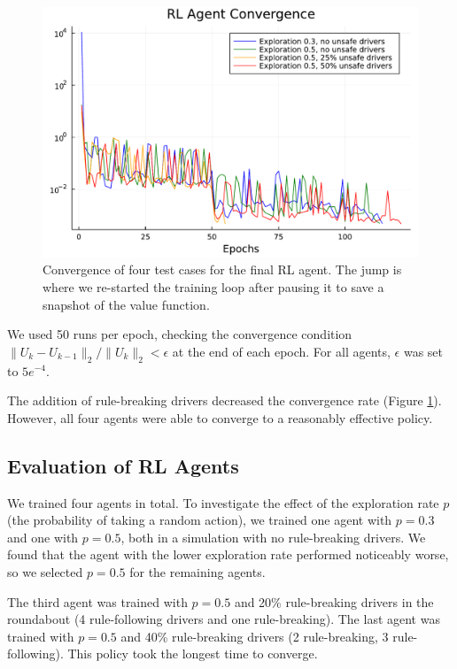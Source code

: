 \documentclass[conference]{IEEEtran}
\begin{document}
\begin{figure}[h]
	\centering
	\includegraphics[width=1.0\linewidth]{figures/final_convergence.pdf}
	\caption{Convergence of four test cases for the final RL agent. The jump is where we re-started the training loop after pausing it to save a snapshot of the value function.}
	\label{fig:convergence}
\end{figure}

We used 50 runs per epoch, checking the convergence condition $\|U_k-U_{k-1}\|_2 / \|U_k\|_2 <\epsilon$ at the end of each epoch. For all agents, $\epsilon$ was set to $5e^{-4}$.

The addition of rule-breaking drivers decreased the convergence rate (Figure \ref{fig:convergence}). However, all four agents were able to converge to a reasonably effective policy.

\subsection*{Evaluation of RL Agents} We trained four agents in total. To investigate the effect of the exploration rate $p$ (the probability of taking a random action), we trained one agent with $p=0.3$ and one with $p=0.5$, both in a simulation with no rule-breaking drivers. We found that the agent with the lower exploration rate performed noticeably worse, so we selected $p=0.5$ for the remaining agents.

The third agent was trained with $p=0.5$ and 20\% rule-breaking drivers in the roundabout (4 rule-following drivers and one rule-breaking).
The last agent was trained with $p=0.5$ and 40\% rule-breaking drivers (2 rule-breaking, 3 rule-following). This policy took the longest time to converge.
\end{document}

